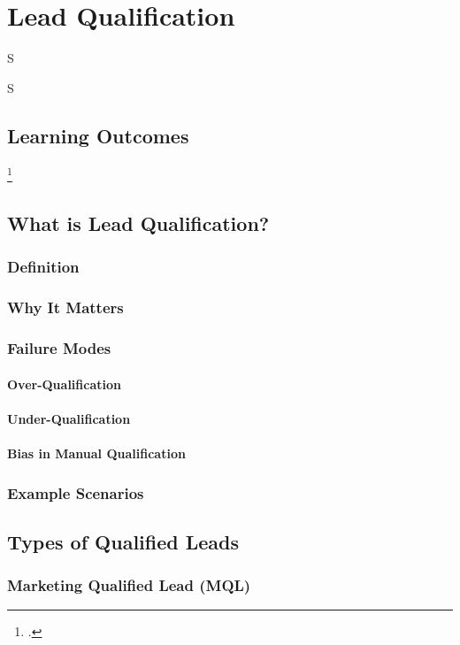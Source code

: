 \frenchspacing
\chapter{Lead Qualification}
\epigraph{S}{S}

%
\section{Learning Outcomes}\mbox{}
\footcite{blount2015fanatical}
%
\section{What is Lead Qualification?}\mbox{}
    \subsection{Definition}\mbox{}
    \subsection{Why It Matters}\mbox{}
    \subsection{Failure Modes}\mbox{}
        \subsubsection{Over-Qualification}\mbox{}
        \subsubsection{Under-Qualification}\mbox{}
        \subsubsection{Bias in Manual Qualification}\mbox{}
    \subsection{Example Scenarios}\mbox{}

\section{Types of Qualified Leads}\mbox{}
    \subsection{Marketing Qualified Lead (MQL)}\mbox{}
